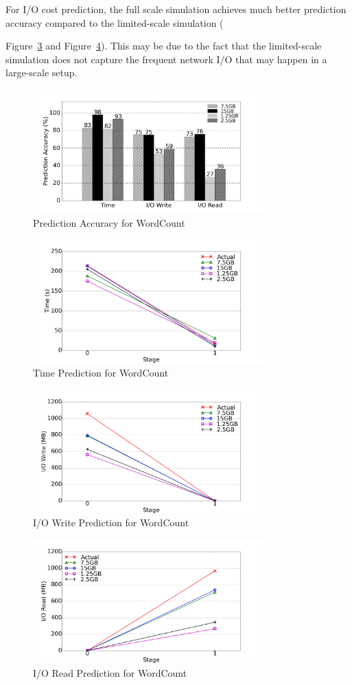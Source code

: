 For I/O cost prediction, the full scale simulation achieves much better prediction accuracy compared to the limited-scale simulation ({Figure~\ref{wc_io_w} and Figure~\ref{wc_io_r}). This may be due to the fact that the limited-scale simulation does not capture the frequent network I/O that may happen in a large-scale setup.
\begin{figure}[!t]
\centering
\includegraphics[width=3.5in]{figures/wc_accuracy.png}
\caption{Prediction Accuracy for WordCount}
\label{wc_accuracy}
\end{figure}
\begin{figure}[!t]
\centering
\includegraphics[width=3.5in]{figures/wc_time.png}
\caption{Time Prediction for WordCount}
\label{wc_time}
\end{figure}
\begin{figure}[!t]
\centering
\includegraphics[width=3.5in]{figures/wc_io_w.png}
\caption{I/O Write Prediction for WordCount}
\label{wc_io_w}
\end{figure}
\begin{figure}[!t]
\centering
\includegraphics[width=3.5in]{figures/wc_io_r.png}
\caption{I/O Read Prediction for WordCount}
\label{wc_io_r}
\end{figure}


}

